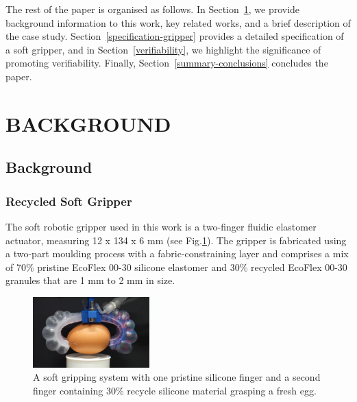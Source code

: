 \documentclass[letterpaper, 10 pt, conference]{ieeeconf}  %
\begin{document}
	The rest of the paper is organised as follows. 
	In Section~\ref{background-relatedwork}, we provide background information to this work, key related works, and a brief description of the case study. %
	Section~\ref{specification-gripper} provides a detailed specification of a soft gripper, and in Section~\ref{verifiability}, we highlight the significance of promoting verifiability.
	Finally, Section~\ref{summary-conclusions} concludes the paper. 	
	
	\section{BACKGROUND}\label{background-relatedwork}
	
	\subsection{Background}\label{background}
	\subsubsection{Recycled Soft Gripper}
	The soft robotic gripper used in this work is a two-finger fluidic elastomer actuator, measuring 12 x 134 x 6 mm \cite{Partridge2022} (see Fig.\ref{gripper}). The gripper is fabricated using a two-part moulding process with a fabric-constraining layer and comprises a mix of 70\% pristine EcoFlex 00-30 silicone elastomer and 30\% recycled EcoFlex 00-30 granules that are 1 mm to 2 mm in size.%
	
	\begin{figure}
		\centering
		\includegraphics[width=0.4\textwidth]{figures/recycledsoftgripper.jpg}%
		\caption{A soft gripping system with one pristine silicone finger and a second finger containing 30\% recycle silicone material grasping a fresh egg.}
		\label{gripper}
		\vspace{-1.3ex}
	\end{figure}
	
\end{document}
